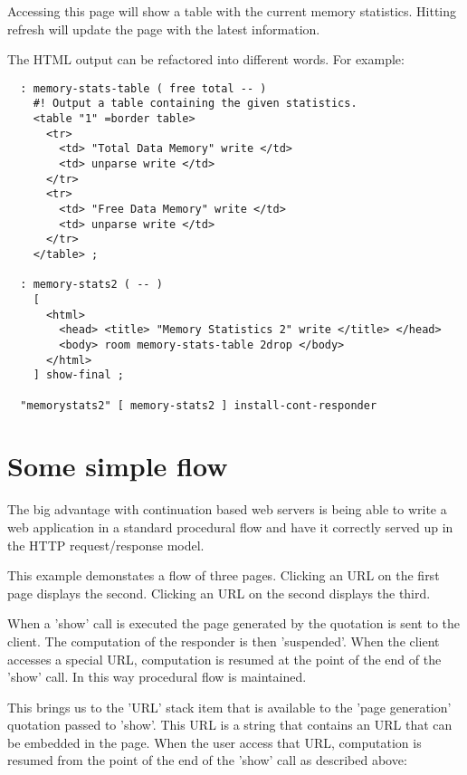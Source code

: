 Accessing this page will show a table with the current memory
statistics. Hitting refresh will update the page with the latest
information.

The HTML output can be refactored into different words. For example:

\begin{verbatim}
  : memory-stats-table ( free total -- )
    #! Output a table containing the given statistics.
    <table "1" =border table>
      <tr> 
        <td> "Total Data Memory" write </td>
        <td> unparse write </td>
      </tr>
      <tr> 
        <td> "Free Data Memory" write </td>
        <td> unparse write </td>
      </tr>
    </table> ;

  : memory-stats2 ( -- )
    [
      <html>
        <head> <title> "Memory Statistics 2" write </title> </head>
        <body> room memory-stats-table 2drop </body>
      </html>
    ] show-final ;

  "memorystats2" [ memory-stats2 ] install-cont-responder
\end{verbatim}

\section{Some simple flow}

The big advantage with continuation based web servers is being able to
write a web application in a standard procedural flow and have it
correctly served up in the HTTP request/response model.

This example demonstates a flow of three pages. Clicking an URL on the
first page displays the second. Clicking an URL on the second displays
the third.

When a 'show' call is executed the page generated by the quotation is
sent to the client. The computation of the responder is then
'suspended'. When the client accesses a special URL, computation is
resumed at the point of the end of the 'show' call. In this way
procedural flow is maintained.

This brings us to the 'URL' stack item that is available to the 'page
generation' quotation passed to 'show'. This URL is a string that
contains an URL that can be embedded in the page. When the user access
that URL, computation is resumed from the point of the end of the
'show' call as described above:

